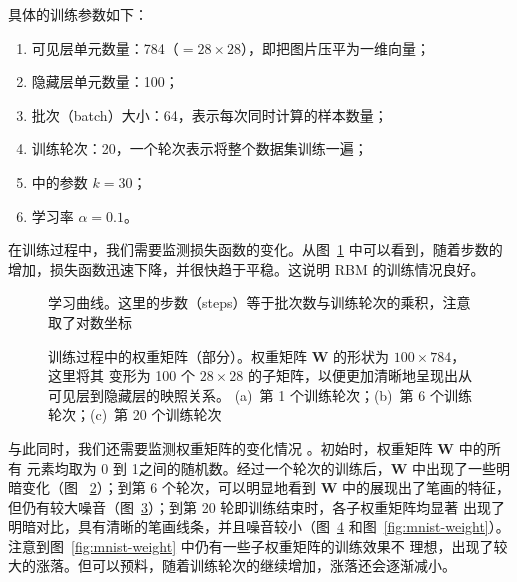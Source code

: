 具体的训练参数如下：

\begin{enumerate}
  \item 可见层单元数量：784（$=28 \times 28$），即把图片压平为一维向量；
  \item 隐藏层单元数量：100；
  \item 批次（batch）大小：64，表示每次同时计算的样本数量；
  \item 训练轮次：20，一个轮次表示将整个数据集训练一遍；
  \item \CDk{} 中的参数 $k=30$；
  \item 学习率 $\alpha=0.1$。
\end{enumerate}

在训练过程中，我们需要监测损失函数的变化。从图~\ref{fig:learning-curve} 中可以看到，随着步数的
增加，损失函数迅速下降，并很快趋于平稳。这说明 RBM 的训练情况良好。

\begin{figure}[htb]
  \centering
  \caption{学习曲线。这里的步数（steps）等于批次数与训练轮次的乘积，注意取了对数坐标}
  \label{fig:learning-curve}
\end{figure}

\begin{figure}[htb]
  \centering
  \begin{subfigure}[b]{0.3\textwidth}
    \centering
    \caption{}
    \label{fig:mnist-weight-epoch-a}
  \end{subfigure}
  \begin{subfigure}[b]{0.3\textwidth}
    \centering
    \caption{}
    \label{fig:mnist-weight-epoch-b}
  \end{subfigure}
  \begin{subfigure}[b]{0.3\textwidth}
    \centering
    \caption{}
    \label{fig:mnist-weight-epoch-c}
  \end{subfigure}
  \caption{训练过程中的权重矩阵（部分）。权重矩阵 $\bm{W}$ 的形状为 $100 \times 784$，这里将其
    变形为 100 个 $28 \times 28$ 的子矩阵，以便更加清晰地呈现出从可见层到隐藏层的映照关系。
    (a)~第 1 个训练轮次；(b)~第 6 个训练轮次；(c)~第 20 个训练轮次}
  \label{fig:mnist-weight-epoch}
\end{figure}

与此同时，我们还需要监测权重矩阵的变化情况 \cite{lyy1994rbm}。初始时，权重矩阵 $\bm{W}$ 中的所有
元素均取为 0 到 1之间的随机数。经过一个轮次的训练后，$\bm{W}$ 中出现了一些明暗变化（图~%
\ref{fig:mnist-weight-epoch-a}）；到第 6 个轮次，可以明显地看到 $\bm{W}$ 中的展现出了笔画的特征，
但仍有较大噪音（图~\ref{fig:mnist-weight-epoch-b}）；到第 20 轮即训练结束时，各子权重矩阵均显著
出现了明暗对比，具有清晰的笔画线条，并且噪音较小（图~\ref{fig:mnist-weight-epoch-c}
和图~\ref{fig:mnist-weight}）。注意到图~\ref{fig:mnist-weight} 中仍有一些子权重矩阵的训练效果不
理想，出现了较大的涨落。但可以预料，随着训练轮次的继续增加，涨落还会逐渐减小。

